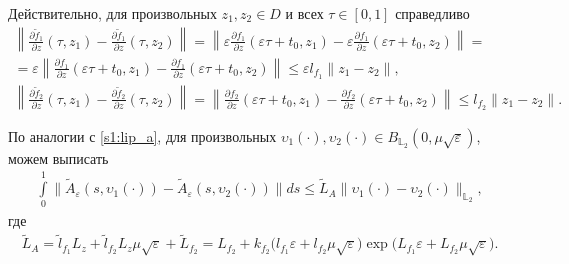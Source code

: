 \documentclass[../main.tex]{subfiles}
\begin{document}
Действительно, для произвольных $z_1, z_2 \in D$ и всех  $\tau \in [0, 1]$ справедливо
\begin{gather*}
	 \left\| \frac{\partial \widetilde{f}_1}{\partial z}(\tau, z_1) - \frac{\partial \widetilde{f}_1}{\partial z}(\tau, z_2) \right\| = 
	 \left\| \varepsilon \frac{\partial f_1}{\partial z}(\varepsilon \tau + t_0, z_1) - \varepsilon \frac{\partial f_1}{\partial z}(\varepsilon \tau + t_0, z_2) \right\| = \\ =
	 \varepsilon \left\|  \frac{\partial f_1}{\partial z}(\varepsilon \tau + t_0, z_1) - \frac{\partial f_1}{\partial z}(\varepsilon \tau + t_0, z_2) \right\| 
	 \leqslant \varepsilon l_{f_1} \| z_1 - z_2\|,  \\
	 \left\| \frac{\partial \widetilde{f}_2}{\partial z}(\tau,z_1) - \frac{\partial \widetilde{f}_2}{\partial z}(\tau,z_2) \right\| = 
	\left\| \frac{\partial f_2}{\partial z}(\varepsilon \tau + t_0,z_1) - \frac{\partial f_2}{\partial z}(\varepsilon \tau + t_0,z_2) \right\| 
	\leqslant l_{f_2} \| z_1 - z_2\|.
\end{gather*}
  
По аналогии с \eqref{s1:lip_a}, для произвольных $ \upsilon_1(\cdot), \upsilon_2(\cdot) \in B_{\mathbb{L}_2}(0,\mu\sqrt{\varepsilon})$, можем выписать
\begin{gather*}
      \int\limits_{0}^{1} \|\widetilde{A}_{\varepsilon}(s, \upsilon_1(\cdot)) - \widetilde{A}_{\varepsilon}(s, \upsilon_2(\cdot)) \| ds \leqslant \widetilde{L}_A \| \upsilon_1(\cdot) - \upsilon_2(\cdot) \|_{\mathbb{L}_2},
\end{gather*}
 где 
\begin{gather*}%
     \widetilde{L}_A = \widetilde{l}_{f_1} L_z  + \widetilde{l}_{f_2} L_z \mu \sqrt{\varepsilon} + \widetilde{L}_{f_2} = 
     L_{f_2} + k_{f_2} \Big( l_{f_1}  \varepsilon  + l_{f_2}  \mu \sqrt{\varepsilon} \Big) \exp\big( L_{f_1} \varepsilon + L_{f_2} \mu \sqrt{\varepsilon} \big).
 \end{gather*}
 
\end{document}
